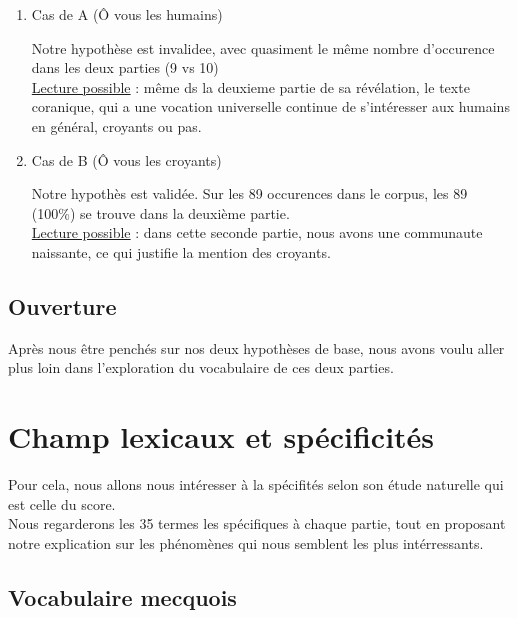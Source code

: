 \documentclass[a4paper,11pt]{report}
\begin{document}
\begin{enumerate}
\item Cas de A (Ô vous les humains)
\label{sec-2-1-1-1}

Notre hypothèse est invalidee, avec quasiment le même nombre d'occurence dans les deux parties (9 vs 10) \\

\uline{Lecture possible} : même ds la deuxieme partie de sa révélation, le texte coranique, qui a une vocation universelle continue de s'intéresser aux humains en général, croyants ou pas. \\

\item Cas de B (Ô vous les croyants)
\label{sec-2-1-1-2}

Notre hypothès est validée. Sur les 89 occurences dans le corpus, les 89 (100\%) se trouve dans la deuxième partie. \\

\uline{Lecture possible} : dans cette seconde partie, nous avons une communaute naissante, ce qui justifie la mention des croyants. \\
\end{enumerate}

\subsection{Ouverture}
\label{sec-2-1-2}

Après nous être penchés sur nos deux hypothèses de base, nous avons voulu aller plus loin dans l'exploration du vocabulaire de ces deux parties. \\

\section{Champ lexicaux et spécificités}
\label{sec-2-2}

Pour cela, nous allons nous intéresser à la spécifités selon son étude naturelle qui est celle du score. \\

Nous regarderons les 35 termes les spécifiques à chaque partie, tout en proposant notre explication sur les phénomènes qui nous semblent les plus intérressants. \\


\subsection{Vocabulaire mecquois}
\label{sec-2-2-1}
\end{document}
